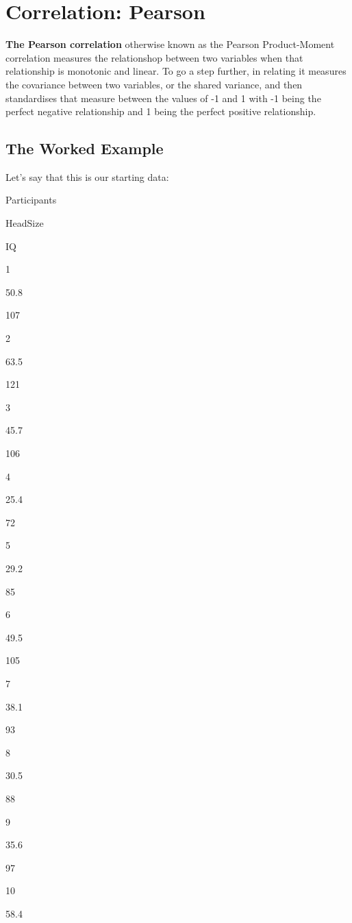 \documentclass[
  oneside]{book}
\begin{document}
\hypertarget{correlation-pearson}{%
\chapter{Correlation: Pearson}\label{correlation-pearson}}

\textbf{The Pearson correlation} otherwise known as the Pearson Product-Moment correlation measures the relationshop between two variables when that relationship is monotonic and linear. To go a step further, in relating it measures the covariance between two variables, or the shared variance, and then standardises that measure between the values of -1 and 1 with -1 being the perfect negative relationship and 1 being the perfect positive relationship.

\hypertarget{the-worked-example-4}{%
\section{The Worked Example}\label{the-worked-example-4}}

Let's say that this is our starting data:

Participants

HeadSize

IQ

1

50.8

107

2

63.5

121

3

45.7

106

4

25.4

72

5

29.2

85

6

49.5

105

7

38.1

93

8

30.5

88

9

35.6

97

10

58.4
\end{document}
